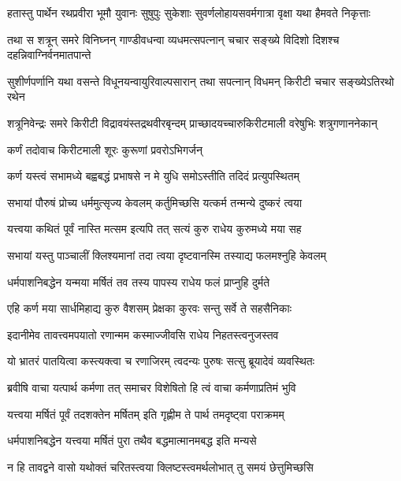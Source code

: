 \fourlineindentedshloka
{हतास्तु पार्थेन रथप्रवीरा}
{भूमौ युवानः सुषुपुः सुकेशाः}
{सुवर्णलोहायसवर्मगात्रा}
{वृक्षा यथा हैमवते निकृत्ताः}


\fourlineindentedshloka
{तथा स शत्रून् समरे विनिघ्नन्}
{गाण्डीवधन्वा व्यधमत्सपत्नान्}
{चचार सङ्ख्ये विदिशो दिशश्च}
{दहन्निवाग्निर्वनमातपान्ते}


\fourlineindentedshloka
{सुशीर्णपर्णानि यथा वसन्ते}
{विधूनयन्वायुरिवाल्पसारान्}
{तथा सपत्नान् विधमन् किरीटी}
{चचार सङ्ख्येऽतिरथो रथेन}


\fourlineindentedshloka
{शत्रूनिवेन्द्रः समरे किरीटी}
{विद्रावयंस्तद्रथवीरबृन्दम्}
{प्राच्छादयच्चारुकिरीटमाली}
{वरेषुभिः शत्रुगणाननेकान्}


\onelineindentedshloka
{कर्णं तदोवाच किरीटमाली}
{शूरः कुरूणां प्रवरोऽभिगर्जन्}


\twolineshloka
{कर्ण यस्त्वं सभामध्ये बह्वबद्धं प्रभाषसे}
{न मे युधि समोऽस्तीति तदिदं प्रत्युपस्थितम्}


\twolineshloka
{सभायां पौरुषं प्रोच्य धर्ममुत्सृज्य केवलम्}
{कर्तुमिच्छसि यत्कर्म तन्मन्ये दुष्करं त्वया}



\twolineshloka
{यत्त्वया कथितं पूर्वं नास्ति मत्सम इत्यपि}
{तत् सत्यं कुरु राधेय कुरुमध्ये मया सह}


\twolineshloka
{सभायां यस्तु पाञ्चालीं क्लिश्यमानां तदा त्वया}
{दृष्टवानस्मि तस्याद्य फलमश्नुहि केवलम्}


\twolineshloka
{धर्मपाशनिबद्धेन यन्मया मर्षितं तव}
{तस्य पापस्य राधेय फलं प्राप्नुहि दुर्मते}


\twolineshloka
{एहि कर्ण मया सार्धमिहाद्य कुरु वैशसम्}
{प्रेक्षका कुरवः सन्तु सर्वे ते सहसैनिकाः}


\twolineshloka
{इदानीमेव तावत्त्वमपयातो रणान्मम}
{कस्माज्जीवसि राधेय निहतस्त्वनुजस्तव}


\twolineshloka
{यो भ्रातरं पातयित्वा कस्त्यक्त्वा च रणाजिरम्}
{त्वदन्यः पुरुषः सत्सु ब्रूयादेवं व्यवस्थितः}




\twolineshloka
{ब्रवीषि वाचा यत्पार्थ कर्मणा तत् समाचर}
{विशेषितो हि त्वं वाचा कर्मणाप्रतिमं भुवि}


\twolineshloka
{यत्त्वया मर्षितं पूर्वं तदशक्तेन मर्षितम्}
{इति गृह्णीम ते पार्थ तमदृष्ट्वा पराक्रमम्}


\twolineshloka
{धर्मपाशनिबद्धेन यत्त्वया मर्षितं पुरा}
{तथैव बद्धमात्मानमबद्ध इति मन्यसे}


\twolineshloka
{न हि तावद्वने वासो यथोक्तं चरितस्त्वया}
{क्लिष्टस्त्वमर्थलोभात् तु समयं छेत्तुमिच्छसि}


